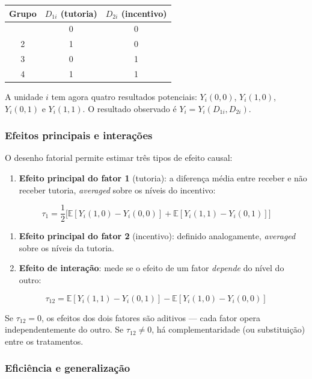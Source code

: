 \documentclass[
]{article}
\providecommand{\tightlist}{%
  \setlength{\itemsep}{0pt}\setlength{\parskip}{0pt}}
\begin{document}
\begin{longtable}[]{@{}ccc@{}}
\toprule\noalign{}
Grupo & \(D_{1i}\) (tutoria) & \(D_{2i}\) (incentivo) \\
\midrule\noalign{}
\endhead
\bottomrule\noalign{}
\endlastfoot
1 & 0 & 0 \\
2 & 1 & 0 \\
3 & 0 & 1 \\
4 & 1 & 1 \\
\end{longtable}

A unidade \(i\) tem agora quatro resultados potenciais: \(Y_i(0,0)\), \(Y_i(1,0)\), \(Y_i(0,1)\) e \(Y_i(1,1)\). O resultado observado é \(Y_i = Y_i(D_{1i}, D_{2i})\).

\subsubsection{Efeitos principais e interações}\label{efeitos-principais-e-interauxe7uxf5es}

O desenho fatorial permite estimar três tipos de efeito causal:

\begin{enumerate}
\def\labelenumi{\arabic{enumi}.}
\tightlist
\item
  \textbf{Efeito principal do fator 1} (tutoria): a diferença média entre receber e não receber tutoria, \emph{averaged} sobre os níveis do incentivo:
\end{enumerate}

\[\tau_1 = \frac{1}{2}\Big[\mathbb{E}[Y_i(1,0) - Y_i(0,0)] + \mathbb{E}[Y_i(1,1) - Y_i(0,1)]\Big]\]

\begin{enumerate}
\def\labelenumi{\arabic{enumi}.}
\setcounter{enumi}{1}
\item
  \textbf{Efeito principal do fator 2} (incentivo): definido analogamente, \emph{averaged} sobre os níveis da tutoria.
\item
  \textbf{Efeito de interação}: mede se o efeito de um fator \emph{depende} do nível do outro:
\end{enumerate}

\[\tau_{12} = \mathbb{E}[Y_i(1,1) - Y_i(0,1)] - \mathbb{E}[Y_i(1,0) - Y_i(0,0)]\]

Se \(\tau_{12} = 0\), os efeitos dos dois fatores são aditivos --- cada fator opera independentemente do outro. Se \(\tau_{12} \neq 0\), há complementaridade (ou substituição) entre os tratamentos.

\subsubsection{Eficiência e generalização}\label{eficiuxeancia-e-generalizauxe7uxe3o}
\end{document}

